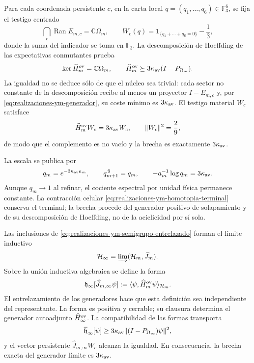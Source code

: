 Para cada coordenada persistente \(c\), en la carta local
\(q=(q_1,\ldots,q_6)\in\mathbb F_3^6\), se fija el testigo centrado
\begin{equation}\label{eq:realizaciones-ym-testigo-definicion}
 \bigcap_c\operatorname{Ran}E_{m,c}=\mathbb C\Omega_m,
 \qquad
 W_c(q)=\mathbf 1_{\{q_1+\cdots+q_6=0\}}-\frac13,
\end{equation}
donde la suma del indicador se toma en \(\mathbb F_3\). La descomposición de
Hoeffding de las expectativas conmutantes prueba
\begin{equation}\label{eq:realizaciones-ym-gap-finito}
 \ker\widehat H_m^{\rm ov}=\mathbb C\Omega_m,
 \qquad
 \widehat H_m^{\rm ov}\succeq
 3\kappa_{\rm av}(I-P_{\Omega_m}).
\end{equation}
La igualdad no se deduce sólo de que el núcleo sea trivial: cada sector no
constante de la descomposición recibe al menos un proyector
\(I-E_{m,c}\) y, por \eqref{eq:realizaciones-ym-generador}, su coste mínimo
es \(3\kappa_{\rm av}\). El testigo material \(W_c\) satisface
\begin{equation}\label{eq:realizaciones-ym-testigo-gap}
 \widehat H_m^{\rm ov}W_c=3\kappa_{\rm av}W_c,
 \qquad \|W_c\|^2=\frac29,
\end{equation}
de modo que el complemento es no vacío y la brecha es exactamente
\(3\kappa_{\rm av}\).

La escala se publica por
\begin{equation}\label{eq:realizaciones-ym-qm}
 q_m=e^{-3\kappa_{\rm av}a_m},
 \qquad q_{m+1}^{\,9}=q_m,
 \qquad -a_m^{-1}\log q_m=3\kappa_{\rm av}.
\end{equation}
Aunque \(q_m\to1\) al refinar, el cociente espectral por unidad física
permanece constante. La contracción celular
\eqref{eq:realizaciones-ym-homotopia-terminal} conserva el terminal; la
brecha procede del generador positivo de solapamiento y de su descomposición de
Hoeffding, no de la aciclicidad por sí sola.

Las inclusiones de \eqref{eq:realizaciones-ym-semigrupo-entrelazado}
forman el límite inductivo
\begin{equation}\label{eq:realizaciones-ym-colimite}
 \mathcal H_\infty=\varinjlim(\mathcal H_m,\widehat J_m).
\end{equation}
Sobre la unión inductiva algebraica se define la forma
\begin{equation}\label{eq:realizaciones-ym-forma-limite}
 \mathfrak h_\infty[\widehat J_{m,\infty}\psi]
 :=\langle\psi,\widehat H_m^{\rm ov}\psi\rangle_{\mathcal H_m}.
\end{equation}
El entrelazamiento de los generadores hace que esta definición sea
independiente del representante. La forma es positiva y cerrable; su
clausura determina el generador autoadjunto \(\widehat H_\infty^{\rm ov}\).
La compatibilidad de las formas transporta
\begin{equation}\label{eq:realizaciones-ym-gap-forma-limite}
 \overline{\mathfrak h}_\infty[\psi]
 \geq3\kappa_{\rm av}
 \|(I-P_{\Omega_\infty})\psi\|^2,
\end{equation}
y el vector persistente
\(\widehat J_{m,\infty}W_c\) alcanza la igualdad. En consecuencia, la
brecha exacta del generador límite es \(3\kappa_{\rm av}\).

